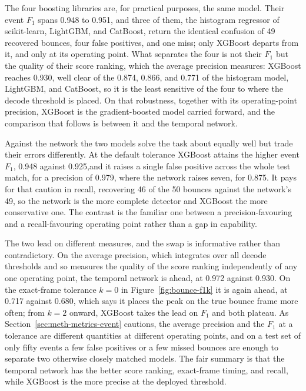 The four boosting libraries are, for practical purposes, the same model. Their
event $F_1$ spans 0.948 to 0.951, and three of them, the histogram regressor of
scikit-learn, LightGBM, and CatBoost, return the identical confusion of 49 recovered
bounces, four false positives, and one miss; only XGBoost departs from it, and only
at its operating point. What separates the four is not their $F_1$ but the quality of
their score ranking, which the average precision measures: XGBoost reaches 0.930,
well clear of the 0.874, 0.866, and 0.771 of the histogram model, LightGBM, and
CatBoost, so it is the least sensitive of the four to where the decode threshold is
placed. On that robustness, together with its operating-point precision, XGBoost is
the gradient-boosted model carried forward, and the comparison that follows is
between it and the temporal network.

Against the network the two models solve the task about equally well but trade their
errors differently. At the default tolerance XGBoost attains the higher event $F_1$,
0.948 against 0.925,and it raises a single
false positive across the whole test match, for a precision of 0.979, where the
network raises seven, for 0.875. It pays for that caution in recall, recovering 46 of
the 50 bounces against the network's 49, so the network is the more complete detector
and XGBoost the more conservative one. The contrast is the familiar one between a
precision-favouring and a recall-favouring operating point rather than a gap in
capability.

The two lead on different measures, and the swap is informative rather than
contradictory. On the average precision, which integrates over all decode thresholds
and so measures the quality of the score ranking independently of any one operating
point, the temporal network is ahead, at 0.972 against 0.930. On the exact-frame
tolerance $k = 0$ in Figure~\ref{fig:bounce-f1k} it is again ahead, at 0.717 against
0.680, which says it places the peak on the true bounce frame more often; from
$k = 2$ onward, XGBoost takes the lead on
$F_1$ and both plateau. As Section~\ref{sec:meth-metrics-event} cautions, the average
precision and the $F_1$ at a tolerance are different quantities at different operating
points, and on a test set of only fifty events a few false positives or a few missed
bounces are enough to separate two otherwise closely matched models. The fair summary
is that the temporal network has the better score ranking, exact-frame timing, and
recall, while XGBoost is the more precise at the deployed threshold.

